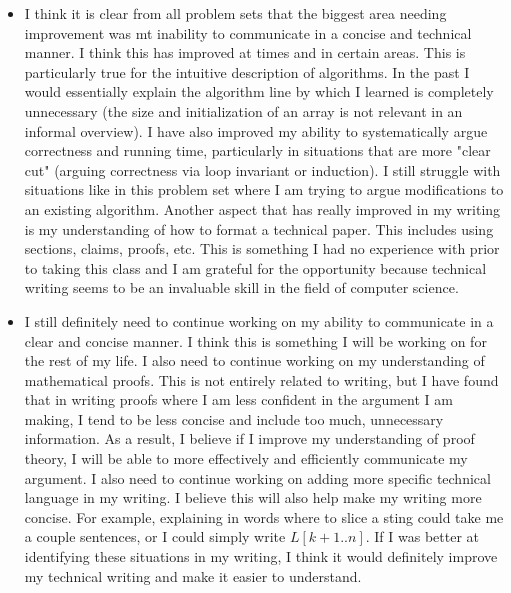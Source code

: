 \documentclass[11pt]{article}
\theoremstyle{nonumberplain}
\begin{document}
\begin{enumerate}
\begin{itemize}
  \item I think it is clear from all problem sets that the biggest area needing improvement was mt inability to communicate in a concise and technical manner. I think this has improved at times and in certain areas. This is particularly true for the intuitive description of algorithms. In the past I would essentially explain the algorithm line by which I learned is completely unnecessary (the size and initialization of an array is not relevant in an informal overview). I have also improved my ability to systematically argue correctness and running time, particularly in situations that are more "clear cut" (arguing correctness via loop invariant or induction). I still struggle with situations like in this problem set where I am trying to argue modifications to an existing algorithm. Another aspect that has really improved in my writing is my understanding of how to format a technical paper. This includes using sections, claims, proofs, etc. This is something I had no experience with prior to taking this class and I am grateful for the opportunity because technical writing seems to be an invaluable skill in the field of computer science.  
  \item I still definitely need to continue working on my ability to communicate in a clear and concise manner. I think this is something I will be working on for the rest of my life. I also need to continue working on my understanding of mathematical proofs. This is not entirely related to writing, but I have found that in writing proofs where I am less confident in the argument I am making, I tend to be less concise and include too much, unnecessary information. As a result, I believe if I improve my understanding of proof theory, I will be able to more effectively and efficiently communicate my argument. I also need to continue working on adding more specific technical language in my writing. I believe this will also help make my writing more concise. For example, explaining in words where to slice a sting could take me a couple sentences, or I could simply write $L[k+1..n]$. If I was better at identifying these situations in my writing, I think it would definitely improve my technical writing and make it easier to understand. 
  \end{itemize}
\end{enumerate}
\end{document}
